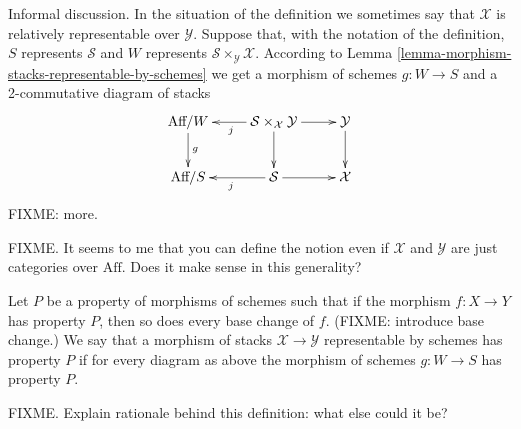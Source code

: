 \noindent
Informal discussion. In the situation of the definition we sometimes 
say that $\mathcal{X}$ is relatively representable over $\mathcal{Y}$.
Suppose that, with the notation of the definition, $S$ represents
$\mathcal{S}$ and $W$ represents $\mathcal{S}\times_\mathcal{Y}\mathcal{X}$.
According to Lemma \ref{lemma-morphism-stacks-representable-by-schemes}
we get a morphism of schemes $g : W \to S$ and a 2-commutative diagram
of stacks
$$
\xymatrix{
\text{Aff}/W \ar[d]^g &
\mathcal{S}\times_\mathcal{X}\mathcal{Y} \ar[d] \ar[l]^j \ar[r] &
\mathcal{Y} \ar[d] \\
\text{Aff}/S &
\mathcal{S} \ar[l]^j \ar[r] & \mathcal{X}
}
$$
FIXME: more.

\medskip\noindent
FIXME. It seems to me that you can define the notion even if 
$\mathcal{X}$ and $\mathcal{Y}$ are just categories over $\text{Aff}$. Does
it make sense in this generality?

\begin{definition}
\label{definition-property-morphism-representable-by-schemes}
Let $P$ be a property of morphisms of schemes such that
if the morphism $f : X \to Y$ has property $P$, then so does
every base change of $f$. (FIXME: introduce base change.)
We say that a morphism of stacks $\mathcal{X}
\to \mathcal{Y}$ representable by schemes has property
$P$ if for every diagram as above the morphism of schemes
$g : W \to S$ has property $P$.
\end{definition}

\noindent
FIXME. Explain rationale behind this definition: what else could it be?







